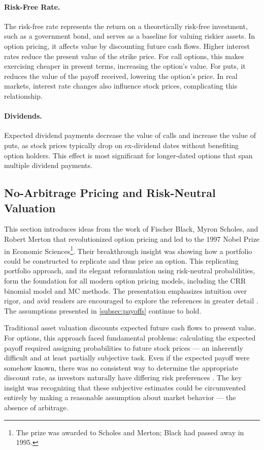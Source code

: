 \documentclass[english,12pt,a4paper,pdftex,sci,utf8]{aaltothesis}
\begin{document}
\paragraph{Risk-Free Rate.} The risk-free rate represents the return on a theoretically risk-free investment, such as a government bond, and serves as a baseline for valuing riskier assets. In option pricing, it affects value by discounting future cash flows. Higher interest rates reduce the present value of the strike price. For call options, this makes exercising cheaper in present terms, increasing the option’s value. For puts, it reduces the value of the payoff received, lowering the option’s price. In real markets, interest rate changes also influence stock prices, complicating this relationship.

\paragraph{Dividends.} Expected dividend payments decrease the value of calls and increase the value of puts, as stock prices typically drop on ex-dividend dates without benefiting option holders. This effect is most significant for longer-dated options that span multiple dividend payments.
\clearpage


\subsection{No-Arbitrage Pricing and Risk-Neutral Valuation}\label{sec:risk-neutral-theory}

This section introduces ideas from the work of Fischer Black, Myron Scholes, and Robert Merton that revolutionized option pricing and led to the 1997 Nobel Prize in Economic Sciences\footnote{The prize was awarded to Scholes and Merton; Black had passed away in 1995.}. Their breakthrough insight was showing how a portfolio could be constructed to replicate and thus price an option. This replicating portfolio approach, and its elegant reformulation using risk-neutral probabilities, form the foundation for all modern option pricing models, including the CRR binomial model and MC methods. The presentation emphasizes intuition over rigor, and avid readers are encouraged to explore the references in greater detail \cite{hull2016options, gisiger2010risk, tham2001risk}. The assumptions presented in \cref{subsec:payoffs} continue to hold.

Traditional asset valuation discounts expected future cash flows to present value. For options, this approach faced fundamental problems: calculating the expected payoff required assigning probabilities to future stock prices --- an inherently difficult and at least partially subjective task. Even if the expected payoff were somehow known, there was no consistent way to determine the appropriate discount rate, as investors naturally have differing risk preferences \cite{nobel1997}. The key insight was recognizing that these subjective estimates could be circumvented entirely by making a reasonable assumption about market behavior --- the absence of arbitrage.
\end{document}

